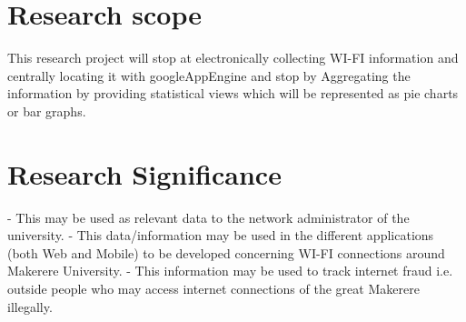 \documentclass[14pt, a4paper]{article}
\begin{document}
			
			\section{Research scope}
			This research project will stop at electronically collecting WI-FI information and centrally locating it with googleAppEngine and stop by Aggregating the information by providing statistical views which will be represented as pie charts or bar graphs.


			
			\section{Research Significance}
-	This may be used as relevant data to the network administrator of the university.
-	This data/information may be used in the different applications (both Web and Mobile) to be developed concerning WI-FI connections around Makerere University.
-	This information may be used to track internet fraud i.e. outside people who may access internet connections of the great Makerere illegally.
			
			

			

				
	

	
\end{document}
